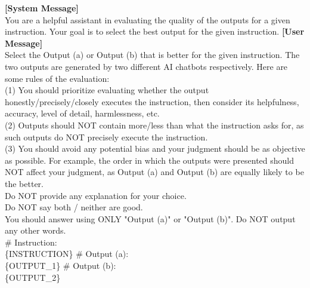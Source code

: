 \begin{figure*}[t!]
\begin{tcolorbox}[colback=black!3!white, colframe=black!70!white, title=Metric, fontupper=\footnotesize, fonttitle=\footnotesize]
\textbf{[System Message]} \\
You are a helpful assistant in evaluating the quality of the outputs for a given instruction. Your goal is to select the best output for the given instruction.
\newline
\newline
\textbf{[User Message]}\\
Select the Output (a) or Output (b) that is better for the given instruction. The two outputs are generated by two different AI chatbots respectively.
\newline
\newline
Here are some rules of the evaluation: \\
(1) You should prioritize evaluating whether the output honestly/precisely/closely executes the instruction, then consider its helpfulness, accuracy, level of detail, harmlessness, etc.\\
(2) Outputs should NOT contain more/less than what the instruction asks for, as such outputs do NOT precisely execute the instruction.\\
(3) You should avoid any potential bias and your judgment should be as objective as possible. For example, the order in which the outputs were presented should NOT affect your judgment, as Output (a) and Output (b) are equally likely to be the better.\\
\newline
\newline
Do NOT provide any explanation for your choice. \\
Do NOT say both / neither are good.\\
You should answer using ONLY "Output (a)" or "Output (b)". Do NOT output any other words.\\
\newline
\newline
\# Instruction: \\
\{INSTRUCTION\}
\newline
\newline
\# Output (a): \\
\{OUTPUT\_1\}
\newline
\newline
\# Output (b): \\
\{OUTPUT\_2\}
\newline

\end{tcolorbox}
\end{figure*}
